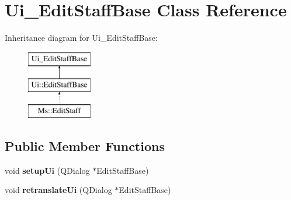 \hypertarget{class_ui___edit_staff_base}{}\section{Ui\+\_\+\+Edit\+Staff\+Base Class Reference}
\label{class_ui___edit_staff_base}
Inheritance diagram for Ui\+\_\+\+Edit\+Staff\+Base\+:\begin{figure}[H]
\begin{center}
\leavevmode
\includegraphics[height=3.000000cm]{class_ui___edit_staff_base}
\end{center}
\end{figure}
\subsection*{Public Member Functions}
\begin{DoxyCompactItemize}
\item 
\mbox{\label{class_ui___edit_staff_base_aee8b86d66aec5cb5594f4b34fef4e7f6}} 
void {\bfseries setup\+Ui} (Q\+Dialog $\ast$Edit\+Staff\+Base)
\item 
\mbox{\label{class_ui___edit_staff_base_adc5ccd52b8c4b4478c242500a6c3817d}} 
void {\bfseries retranslate\+Ui} (Q\+Dialog $\ast$Edit\+Staff\+Base)
\end{DoxyCompactItemize}
